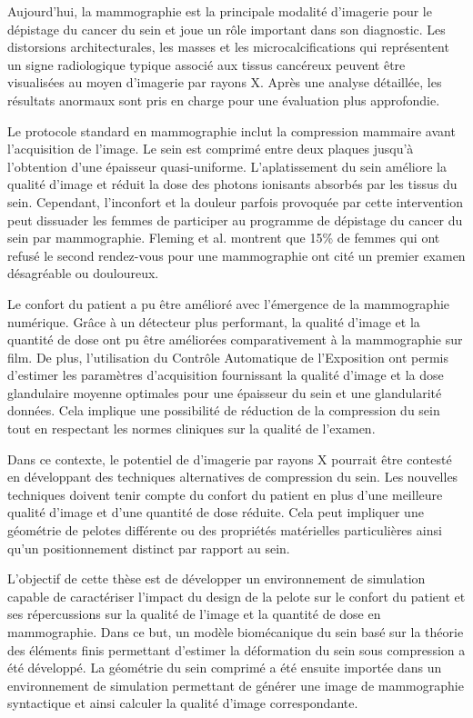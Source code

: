 
Aujourd'hui, la mammographie est la principale modalité d'imagerie pour le dépistage du cancer du sein et joue un rôle important dans son diagnostic. Les distorsions architecturales, les masses et les microcalcifications qui représentent un signe radiologique typique associé aux tissus cancéreux peuvent être visualisées au moyen d'imagerie par rayons X. Après une analyse détaillée, les résultats anormaux sont pris en charge pour une évaluation plus approfondie.

Le protocole standard en mammographie inclut la compression mammaire avant l'acquisition de l'image. Le sein est comprimé entre deux plaques jusqu'à l'obtention d'une épaisseur quasi-uniforme. L'aplatissement du sein améliore la qualité d'image et réduit la dose des photons ionisants absorbés par les tissus du sein. Cependant, l'inconfort et la douleur parfois provoquée par cette intervention peut dissuader les femmes de participer au programme de dépistage du cancer du sein par mammographie. Fleming et al. \citep{fleming_intermittent_2013} montrent que 15\% de femmes qui ont refusé le second rendez-vous pour une mammographie ont cité un premier examen désagréable ou douloureux.

Le confort du patient a pu être amélioré avec l'émergence de la mammographie numérique. Grâce à un détecteur plus performant, la qualité d'image et la quantité de dose ont pu être améliorées comparativement à la mammographie sur film. De plus, l'utilisation du Contrôle Automatique de l'Exposition ont permis d'estimer les paramètres d'acquisition fournissant la qualité d'image et la dose glandulaire moyenne optimales pour une épaisseur du sein et une glandularité données. Cela implique une possibilité de réduction de la compression du sein tout en respectant les normes cliniques sur la qualité de l'examen.

Dans ce contexte, le potentiel de d'imagerie par rayons X pourrait être contesté en développant des techniques alternatives de compression du sein. Les nouvelles techniques doivent tenir compte du confort du patient en plus d'une meilleure qualité d'image et d'une quantité de dose réduite. Cela peut impliquer une géométrie de pelotes différente ou des propriétés matérielles particulières ainsi qu'un positionnement distinct par rapport au sein.

L'objectif de cette thèse est de développer un environnement de simulation capable de caractériser l'impact du design de la pelote sur le confort du patient et ses répercussions sur la qualité de l'image et la quantité de dose en mammographie. Dans ce but, un modèle biomécanique du sein basé sur la théorie des éléments finis permettant d'estimer la déformation du sein sous compression a été développé. La géométrie du sein comprimé a été ensuite importée dans un environnement de simulation permettant de générer une image de mammographie syntactique et ainsi calculer la qualité d'image correspondante. 

